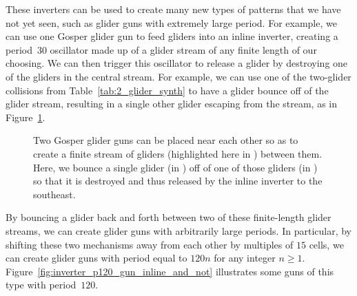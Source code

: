 These inverters can be used to create many new types of patterns that we have not yet seen, such as glider guns with extremely large period. For example, we can use one Gosper glider gun to feed gliders into an inline inverter, creating a period~$30$ oscillator made up of a glider stream of any finite length of our choosing. We can then trigger this oscillator to release a glider by destroying one of the gliders in the central stream. For example, we can use one of the two-glider collisions from Table~\ref{tab:2_glider_synth} to have a glider bounce off of the glider stream, resulting in a single other glider escaping from the stream, as in Figure~\ref{fig:inline_inverter_bounce}.

\begin{figure}[!htb]
	\centering
	\caption{Two Gosper glider guns can be placed near each other so as to create a finite stream of gliders (highlighted here in ) between them. Here, we bounce a single glider (in ) off of one of those gliders (in ) so that it is destroyed and thus released by the inline inverter to the southeast.}
	\label{fig:inline_inverter_bounce}
\end{figure}

By bouncing a glider back and forth between two of these finite-length glider streams, we can create glider guns with arbitrarily large periods. In particular, by shifting these two mechanisms away from each other by multiples of $15$ cells, we can create glider guns with period equal to $120n$ for any integer $n \geq 1$. Figure~\ref{fig:inverter_p120_gun_inline_and_not} illustrates some guns of this type with period~$120$.


